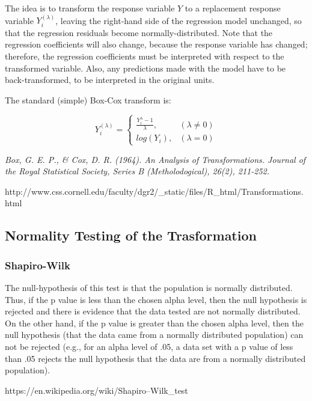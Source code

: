 \documentclass[
  letterpaper,
  DIV=11,
  numbers=noendperiod]{scrartcl}
\begin{document}
The idea is to transform the response variable \(Y\) to a replacement
response variable \(Y_i^{(\lambda)}\), leaving the right-hand side of
the regression model unchanged, so that the regression residuals become
normally-distributed. Note that the regression coefficients will also
change, because the response variable has changed; therefore, the
regression coefficients must be interpreted with respect to the
transformed variable. Also, any predictions made with the model have to
be back-transformed, to be interpreted in the original units.

The standard (simple) Box-Cox transform is:

\[
    Y_i^{(\lambda)}=
\begin{cases}
{\frac {Y_i^\lambda - 1} \lambda},  & {(\lambda \neq 0)} \\
log(Y_i), & {(\lambda = 0)}
\end{cases}
\]

\emph{Box, G. E. P., \& Cox, D. R. (1964). An Analysis of
Transformations. Journal of the Royal Statistical Society, Series B
(Metholodogical), 26(2), 211-252.}

http://www.css.cornell.edu/faculty/dgr2/\_static/files/R\_html/Transformations.html

\hypertarget{normality-testing-of-the-trasformation}{%
\subsection{Normality Testing of the
Trasformation}\label{normality-testing-of-the-trasformation}}

\hypertarget{shapiro-wilk}{%
\subsubsection{Shapiro-Wilk}\label{shapiro-wilk}}

The null-hypothesis of this test is that the population is normally
distributed. Thus, if the p value is less than the chosen alpha level,
then the null hypothesis is rejected and there is evidence that the data
tested are not normally distributed. On the other hand, if the p value
is greater than the chosen alpha level, then the null hypothesis (that
the data came from a normally distributed population) can not be
rejected (e.g., for an alpha level of .05, a data set with a p value of
less than .05 rejects the null hypothesis that the data are from a
normally distributed population).

https://en.wikipedia.org/wiki/Shapiro--Wilk\_test
\end{document}
